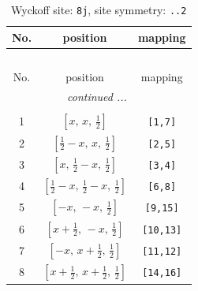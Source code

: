 \documentclass[fleqn,8pt]{jsarticle}
\begin{document}
\begin{longtable}{ccc}
\caption{Wyckoff site: {\tt 8j}, site symmetry: {\tt ..2}}
 \\
 \hline \hline
No. & position & mapping \\ \hline \endfirsthead

\multicolumn{2}{l}{\tablename\ \thetable{}} \\
 \hline \hline
No. & position & mapping \\ \hline \endhead

 \hline \hline
\multicolumn{2}{r}{\footnotesize\it continued ...} \\ \endfoot

 \hline \hline
\multicolumn{2}{r}{} \\ \endlastfoot

1 & $\left[ x,\, x,\, \frac{1}{2} \right]$ & {\tt [1,7]} \\ \hline
2 & $\left[ \frac{1}{2} - x,\, x,\, \frac{1}{2} \right]$ & {\tt [2,5]} \\ \hline
3 & $\left[ x,\, \frac{1}{2} - x,\, \frac{1}{2} \right]$ & {\tt [3,4]} \\ \hline
4 & $\left[ \frac{1}{2} - x,\, \frac{1}{2} - x,\, \frac{1}{2} \right]$ & {\tt [6,8]} \\ \hline
5 & $\left[ - x,\, - x,\, \frac{1}{2} \right]$ & {\tt [9,15]} \\ \hline
6 & $\left[ x + \frac{1}{2},\, - x,\, \frac{1}{2} \right]$ & {\tt [10,13]} \\ \hline
7 & $\left[ - x,\, x + \frac{1}{2},\, \frac{1}{2} \right]$ & {\tt [11,12]} \\ \hline
8 & $\left[ x + \frac{1}{2},\, x + \frac{1}{2},\, \frac{1}{2} \right]$ & {\tt [14,16]} \\
\end{longtable}
\renewcommand{\arraystretch}{1.2}
\end{document}
